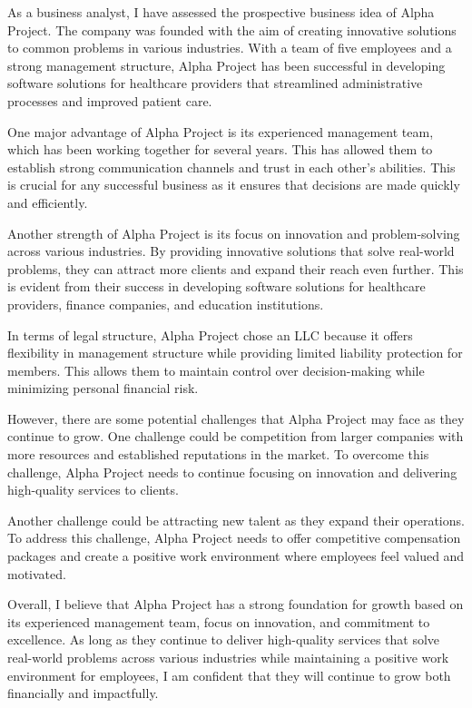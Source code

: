 As a business analyst, I have assessed the prospective business idea of Alpha Project. The company was founded with the aim of creating innovative solutions to common problems in various industries. With a team of five employees and a strong management structure, Alpha Project has been successful in developing software solutions for healthcare providers that streamlined administrative processes and improved patient care.

One major advantage of Alpha Project is its experienced management team, which has been working together for several years. This has allowed them to establish strong communication channels and trust in each other's abilities. This is crucial for any successful business as it ensures that decisions are made quickly and efficiently.

Another strength of Alpha Project is its focus on innovation and problem-solving across various industries. By providing innovative solutions that solve real-world problems, they can attract more clients and expand their reach even further. This is evident from their success in developing software solutions for healthcare providers, finance companies, and education institutions.

In terms of legal structure, Alpha Project chose an LLC because it offers flexibility in management structure while providing limited liability protection for members. This allows them to maintain control over decision-making while minimizing personal financial risk.

However, there are some potential challenges that Alpha Project may face as they continue to grow. One challenge could be competition from larger companies with more resources and established reputations in the market. To overcome this challenge, Alpha Project needs to continue focusing on innovation and delivering high-quality services to clients.

Another challenge could be attracting new talent as they expand their operations. To address this challenge, Alpha Project needs to offer competitive compensation packages and create a positive work environment where employees feel valued and motivated.

Overall, I believe that Alpha Project has a strong foundation for growth based on its experienced management team, focus on innovation, and commitment to excellence. As long as they continue to deliver high-quality services that solve real-world problems across various industries while maintaining a positive work environment for employees, I am confident that they will continue to grow both financially and impactfully.